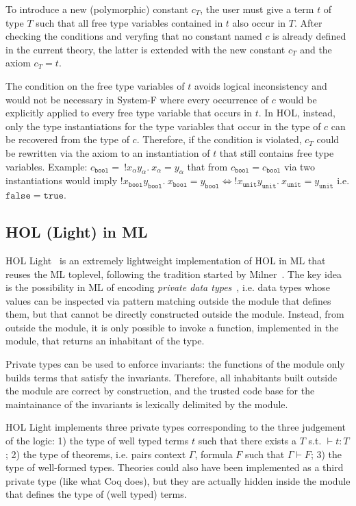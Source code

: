 \documentclass[preprint]{sigplanconf}
\begin{document}
To introduce a new (polymorphic) constant $c_T$, the user must give a term $t$
of type $T$ such that all free type variables contained in $t$ also occur in
$T$. After checking the conditions and veryfing that no constant named $c$ is already defined in the current theory, the latter is extended with the new
constant $c_T$ and the axiom $c_T = t$.

The condition on the free type variables of $t$ avoids logical inconsistency
and would not be necessary in System-F where every occurrence of $c$ would be explicitly applied to every free type variable that occurs in $t$. In HOL, instead, only the type instantiations for the type variables that occur in the type of $c$ can be recovered from the type of $c$. Therefore, if the condition is violated, $c_T$ could be rewritten via the axiom to an instantiation of $t$ that still contains free type variables. Example: $c_\mathtt{bool} = \ ! x_\alpha y_\alpha. \  x_\alpha = y_\alpha$ that from $c_\mathtt{bool} = c_\mathtt{bool}$ via two instantiations would imply $! x_\mathtt{bool} y_\mathtt{bool}. \  x_\mathtt{bool}= y_\mathtt{bool} \iff ! x_\mathtt{unit} y_\mathtt{unit}. \  x_\mathtt{unit}= y_\mathtt{unit}$ i.e. $\mathtt{false} = \mathtt{true}$.

\subsection{HOL (Light) in ML}
HOL Light~\cite{hol1} is an extremely lightweight implementation of HOL in ML that reuses the ML toplevel, following the tradition started by Milner~\cite{milner1}. The key idea is the possibility in ML of encoding \emph{private data types}~\cite{leroy1}, i.e. data types whose values can be inspected via pattern matching outside the module that defines them, but that cannot be directly constructed outside the module. Instead, from outside the module, it is only possible to invoke a function, implemented in the module, that returns an inhabitant of the type.

Private types can be used to enforce invariants: the functions of the module only builds terms that satisfy the invariants. Therefore, all inhabitants built outside the module are correct by construction, and the trusted code base for the maintainance of the invariants is lexically delimited by the module.

HOL Light implements three private types corresponding to the three judgement of the logic: 1) the type of well typed terms $t$ such that there exists a $T$ s.t. $\vdash t : T$; 2) the type of theorems, i.e. pairs context $\Gamma$, formula $F$ such that $\Gamma \vdash F$; 3) the type of well-formed types. Theories could also have been implemented as a third private type (like what Coq does), but they are actually hidden inside the module that defines the type of (well typed) terms.
\end{document}
